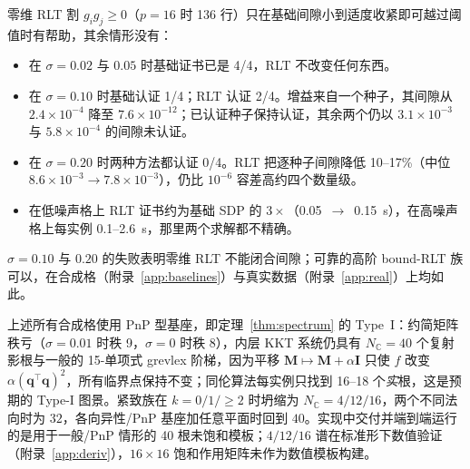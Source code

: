 零维 RLT 割 $g_ig_j\ge0$（$p=16$ 时 136 行）只在基础间隙小到适度收紧即可越过阈值时有帮助，其余情形没有：
\begin{itemize}
\item 在 $\sigma=0.02$ 与 $0.05$ 时基础证书已是 4/4，RLT 不改变任何东西。
\item 在 $\sigma=0.10$ 时基础认证 1/4；RLT 认证 2/4。增益来自一个种子，其间隙从 $2.4\times10^{-4}$ 降至 $7.6\times10^{-12}$；已认证种子保持认证，其余两个仍以 $3.1\times10^{-3}$ 与 $5.8\times10^{-4}$ 的间隙未认证。
\item 在 $\sigma=0.20$ 时两种方法都认证 0/4。RLT 把逐种子间隙降低 10--17\%（中位 $8.6\times10^{-3}\to7.8\times10^{-3}$），仍比 $10^{-6}$ 容差高约四个数量级。
\item 在低噪声格上 RLT 证书约为基础 SDP 的 $3\times$（0.05~$\to$~0.15~s），在高噪声格上每实例 0.1--2.6~s，那里两个求解都不精确。
\end{itemize}
$\sigma=0.10$ 与 $0.20$ 的失败表明零维 RLT 不能闭合间隙；可靠的高阶 bound-RLT 族可以，在合成格（附录~\ref{app:baselines}）与真实数据（附录~\ref{app:real}）上均如此。

上述所有合成格使用 PnP 型基座，即定理~\ref{thm:spectrum} 的 Type~I：约简矩阵秩亏（$\sigma=0.01$ 时秩 9，$\sigma=0$ 时秩 8），内层 KKT 系统仍具有 $N_{\mathbb C}=40$ 个复射影根与一般的 15-单项式 grevlex 阶梯，因为平移 $\mathbf M\mapsto\mathbf M+\alpha\mathbf I$ 只使 $f$ 改变 $\alpha(\mathbf q^\top\mathbf q)^2$，所有临界点保持不变；同伦算法每实例只找到 16--18 个\emph{实}根，这是预期的 Type-I 图景。紧致族在 $k=0/1/\ge2$ 时坍缩为 $N_{\mathbb C}=4/12/16$，两个不同法向时为 $32$，各向异性/PnP 基座加任意平面时回到 $40$。实现中交付并端到端运行的是用于一般/PnP 情形的 40 根未饱和模板；$4/12/16$ 谱在标准形下数值验证（附录~\ref{app:deriv}），$16\times16$ 饱和作用矩阵未作为数值模板构建。

